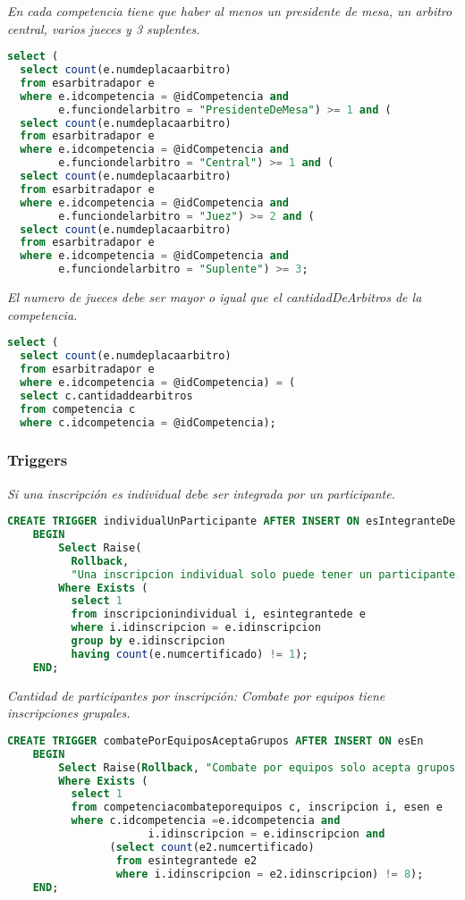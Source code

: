 \emph{En cada competencia tiene que haber al menos un presidente de mesa, un arbitro central, varios jueces y 3 suplentes.}

\begin{lstlisting}[language=SQL]
select (
  select count(e.numdeplacaarbitro)
  from esarbitradapor e
  where e.idcompetencia = @idCompetencia and
        e.funciondelarbitro = "PresidenteDeMesa") >= 1 and (
  select count(e.numdeplacaarbitro)
  from esarbitradapor e
  where e.idcompetencia = @idCompetencia and
        e.funciondelarbitro = "Central") >= 1 and (
  select count(e.numdeplacaarbitro)
  from esarbitradapor e
  where e.idcompetencia = @idCompetencia and
        e.funciondelarbitro = "Juez") >= 2 and (
  select count(e.numdeplacaarbitro)
  from esarbitradapor e
  where e.idcompetencia = @idCompetencia and
        e.funciondelarbitro = "Suplente") >= 3;
\end{lstlisting}

\emph{El numero de jueces debe ser mayor o igual que el cantidadDeArbitros de la competencia.}

\begin{lstlisting}[language=SQL]
select (
  select count(e.numdeplacaarbitro)
  from esarbitradapor e
  where e.idcompetencia = @idCompetencia) = (
  select c.cantidaddearbitros
  from competencia c
  where c.idcompetencia = @idCompetencia);
\end{lstlisting}

\subsubsection{Triggers}

\emph{Si una inscripción es individual debe ser integrada por un participante.}

\begin{lstlisting}[language=SQL]
CREATE TRIGGER individualUnParticipante AFTER INSERT ON esIntegranteDe
    BEGIN
        Select Raise(
          Rollback,
          "Una inscripcion individual solo puede tener un participante.")
        Where Exists (
          select 1
          from inscripcionindividual i, esintegrantede e
          where i.idinscripcion = e.idinscripcion
          group by e.idinscripcion
          having count(e.numcertificado) != 1);
    END;
\end{lstlisting}

\emph{Cantidad de participantes por inscripción: Combate por equipos tiene inscripciones grupales.}

\begin{lstlisting}[language=SQL]
CREATE TRIGGER combatePorEquiposAceptaGrupos AFTER INSERT ON esEn
    BEGIN
        Select Raise(Rollback, "Combate por equipos solo acepta grupos.")
        Where Exists (
          select 1
          from competenciacombateporequipos c, inscripcion i, esen e
          where c.idcompetencia =e.idcompetencia and
                      i.idinscripcion = e.idinscripcion and
                (select count(e2.numcertificado)
                 from esintegrantede e2
                 where i.idinscripcion = e2.idinscripcion) != 8);
    END;
\end{lstlisting}

